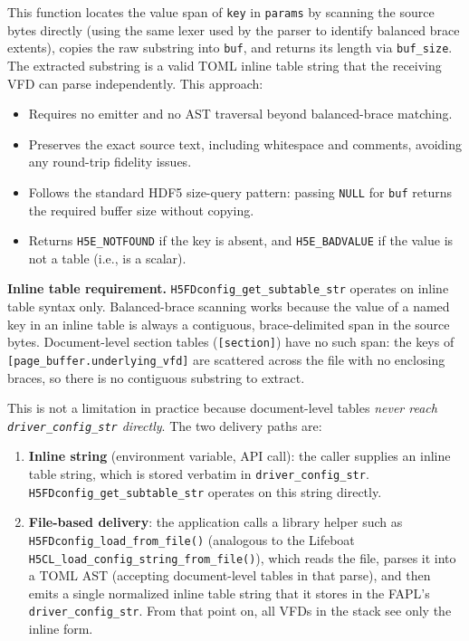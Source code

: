 \documentclass[../RFC-HDFG-2026-001.tex]{subfiles}
\begin{document}
This function locates the value span of \texttt{key} in \texttt{params} by
scanning the source bytes directly (using the same lexer used by the parser
to identify balanced brace extents), copies the raw substring into
\texttt{buf}, and returns its length via \texttt{buf\_size}.  The extracted
substring is a valid TOML inline table string that the receiving VFD can
parse independently.  This approach:

\begin{itemize}
\item Requires no emitter and no AST traversal beyond balanced-brace matching.
\item Preserves the exact source text, including whitespace and comments,
  avoiding any round-trip fidelity issues.
\item Follows the standard HDF5 size-query pattern: passing \texttt{NULL} for
  \texttt{buf} returns the required buffer size without copying.
\item Returns \texttt{H5E\_NOTFOUND} if the key is absent, and
  \texttt{H5E\_BADVALUE} if the value is not a table (i.e., is a scalar).
\end{itemize}

\textbf{Inline table requirement.}
\texttt{H5FDconfig\_get\_subtable\_str} operates on inline table syntax only.
Balanced-brace scanning works because the value of a named key in an inline
table is always a contiguous, brace-delimited span in the source bytes.
Document-level section tables (\texttt{[section]}) have no such span: the
keys of \texttt{[page\_buffer.underlying\_vfd]} are scattered across the file
with no enclosing braces, so there is no contiguous substring to extract.

This is not a limitation in practice because document-level tables
\emph{never reach \texttt{driver\_config\_str} directly}.  The two delivery
paths are:

\begin{enumerate}
\item \textbf{Inline string} (environment variable, API call): the caller
  supplies an inline table string, which is stored verbatim in
  \texttt{driver\_config\_str}.  \texttt{H5FDconfig\_get\_subtable\_str}
  operates on this string directly.
\item \textbf{File-based delivery}: the application calls a library helper
  such as \texttt{H5FDconfig\_load\_from\_file()} (analogous to the Lifeboat
  \texttt{H5CL\_load\_config\_string\_from\_file()}), which reads the file,
  parses it into a TOML AST (accepting document-level tables in that parse),
  and then emits a single normalized inline table string that it stores in
  the FAPL's \texttt{driver\_config\_str}.  From that point on, all VFDs in
  the stack see only the inline form.
\end{enumerate}
\end{document}

